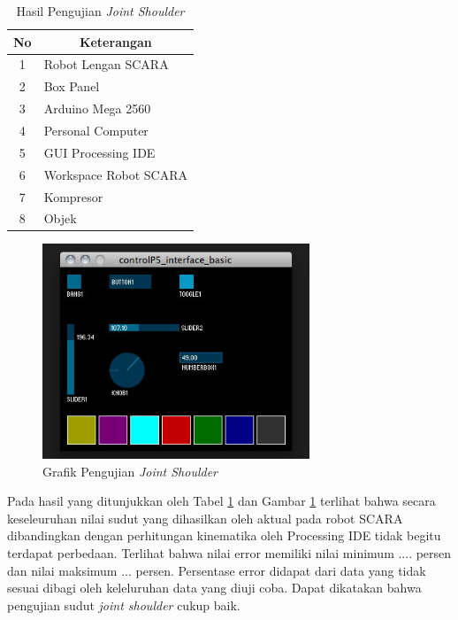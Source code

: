 \begin{table}[H]
	\centering
	\caption{Hasil Pengujian \textit{Joint Shoulder}}
	\label{tbl.jointshoulder}
	\begin{tabular}{|c|l|}
		\hline
		\rowcolor[HTML]{9B9B9B} 
		
		No & \multicolumn{1}{c|}{\cellcolor[HTML]{9B9B9B}Keterangan} \\ \hline
		1  & Robot Lengan SCARA                                      \\ \hline
		2  & Box Panel                                               \\ \hline
		3  & Arduino Mega 2560                                       \\ \hline
		4  & Personal Computer                                       \\ \hline
		5  & GUI Processing IDE                                      \\ \hline
		6  & Workspace Robot SCARA                                   \\ \hline
		7  & Kompresor                                               \\ \hline
		8  & Objek                                                   \\ \hline
	\end{tabular}
	
\end{table} 
\begin{figure}[H]
	\centering
	\includegraphics[width=8cm]{gambar/controlp5.jpg}
	\caption{Grafik Pengujian \textit{Joint Shoulder}}
	\label{pic.jointshoulder}
\end{figure}

Pada hasil yang ditunjukkan oleh Tabel \ref{tbl.jointshoulder} dan Gambar \ref{pic.jointshoulder} terlihat bahwa secara keseleuruhan nilai sudut yang dihasilkan oleh aktual pada robot SCARA dibandingkan dengan perhitungan kinematika oleh Processing IDE tidak begitu terdapat perbedaan. Terlihat bahwa nilai error
 memiliki nilai minimum .... persen dan nilai maksimum ... persen. Persentase error didapat dari data yang tidak sesuai dibagi oleh keleluruhan data yang diuji coba. Dapat dikatakan bahwa pengujian sudut \textit{joint shoulder} cukup baik.
 
